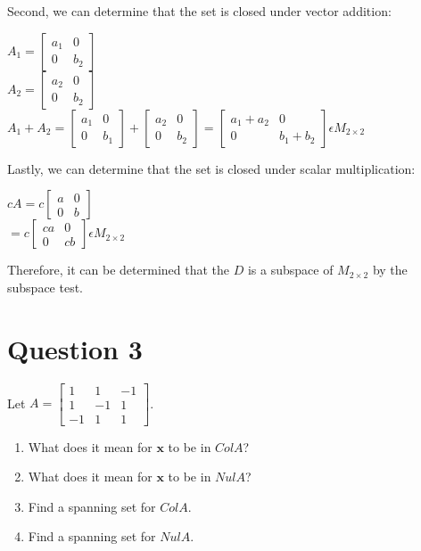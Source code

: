 \documentclass{report}
\begin{document}
Second, we can determine that the set is closed under vector addition:
\begin{center}
    $A_1 = \begin{bmatrix} a_1 & 0 \\ 0 & b_2 \end{bmatrix}$\\
    $A_2 = \begin{bmatrix} a_2 & 0 \\ 0 & b_2 \end{bmatrix}$\\
    $A_1 + A_2 = \begin{bmatrix} a_1 & 0 \\ 0 & b_1 \end{bmatrix} + \begin{bmatrix} a_2 & 0 \\ 0 & b_2 \end{bmatrix} = \begin{bmatrix} a_1+a_2 & 0 \\ 0 & b_1+b_2 \end{bmatrix} \epsilon M_{2\times2}$\\
\end{center}

Lastly, we can determine that the set is closed under scalar multiplication:
\begin{center}
    $cA = c\begin{bmatrix} a & 0 \\ 0 & b \end{bmatrix}$\\
    $= c\begin{bmatrix} ca & 0 \\ 0 & cb \end{bmatrix}\epsilon M_{2\times2}$\\
\end{center}
Therefore, it can be determined that the $D$ is a subspace of $M_{2\times 2}$ by the subspace test.
\clearpage

\section*{Question 3}
\begin{example}
    Let $A = \begin{bmatrix} 1 & 1 & -1 \\ 1 & -1 & 1 \\ -1 & 1 & 1 \end{bmatrix}$.
    \begin{enumerate}
     \item What does it mean for $\mathbf{x}$ to be in $Col A$? 
     \item What does it mean for $\mathbf{x}$ to be in $Nul A$?
     \item Find a spanning set for $Col A$.
     \item Find a spanning set for $Nul A$.
    \end{enumerate}
\end{example}
\end{document}
